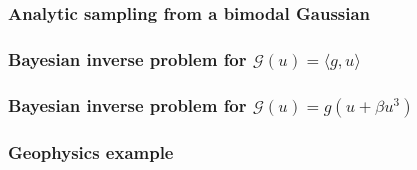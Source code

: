 \documentclass[11pt]{article}
\newcommand{\G}[1]{{\mathcal{G} \left( #1 \right)}}
\begin{document}
\subsubsection{Analytic sampling from a bimodal Gaussian}
\label{sec:orgc2e4e38}
\subsubsection{Bayesian inverse problem for \(\G{u} = \langle g,u \rangle\)}
\label{sec:orge157133}
\subsubsection{Bayesian inverse problem for \(\G{u} = g (u + \beta u^3)\)}
\label{sec:orgca667cf}
\subsubsection{Geophysics example}
\label{sec:orgff276a7}




\end{document}
